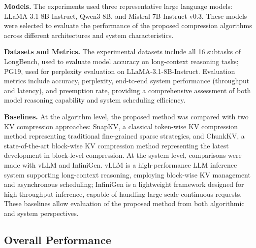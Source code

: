 \documentclass[sigplan,10pt,review,anonymous]{acmart}
\begin{document}
\textbf{Models.} 
The experiments used three representative large language models: LLaMA-3.1-8B-Instruct, Qwen3-8B, and Mistral-7B-Instruct-v0.3. 
These models were selected to evaluate the performance of the proposed compression algorithms across different architectures and system characteristics.

\textbf{Datasets and Metrics.} 
The experimental datasets include all 16 subtasks of LongBench, used to evaluate model accuracy on long-context reasoning tasks; PG19, used for perplexity evaluation on LLaMA-3.1-8B-Instruct. 
Evaluation metrics include accuracy, perplexity, end-to-end system performance (throughput and latency), and preemption rate, providing a comprehensive assessment of both model reasoning capability and system scheduling efficiency.

\textbf{Baselines.} 
At the algorithm level, the proposed method was compared with two KV compression approaches: SnapKV, a classical token-wise KV compression method representing traditional fine-grained sparse strategies, and ChunkKV, a state-of-the-art block-wise KV compression method representing the latest development in block-level compression. 
At the system level, comparisons were made with vLLM and InfiniGen. 
vLLM is a high-performance LLM inference system supporting long-context reasoning, employing block-wise KV management and asynchronous scheduling; InfiniGen is a lightweight framework designed for high-throughput inference, capable of handling large-scale continuous requests. 
These baselines allow evaluation of the proposed method from both algorithmic and system perspectives.

\subsection{Overall Performance}
\end{document}
